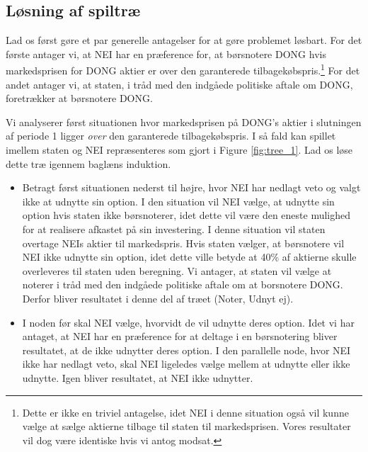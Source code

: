\documentclass{article}
\begin{document}
\begin{appendices}
\renewcommand\appendixname{Appendiks}

\section{Løsning af spiltræ}
\label{sec:app_tree}
Lad os først gøre et par generelle antagelser for at gøre problemet løsbart. For det første antager vi, at NEI har en præference for, at børsnotere DONG hvis markedsprisen for DONG aktier er over den garanterede tilbagekøbspris.\footnote{Dette er ikke en triviel antagelse, idet NEI i denne situation også vil kunne vælge at sælge aktierne tilbage til staten til markedsprisen. Vores resultater vil dog være identiske hvis vi antog modsat.} For det andet antager vi, at staten, i tråd med den indgåede politiske aftale om DONG, foretrækker at børsnotere DONG. %

Vi analyserer først situationen hvor markedsprisen på DONG's aktier i slutningen af periode 1 ligger \textit{over} den garanterede tilbagekøbspris. I så fald kan spillet imellem staten og NEI repræsenteres som gjort i Figure \ref{fig:tree_1}. Lad os løse dette træ igennem baglæns induktion.  

\begin{itemize}

	\item Betragt først situationen nederst til højre, hvor NEI har nedlagt veto og valgt ikke at udnytte sin option. I den situation vil NEI vælge, at udnytte sin option hvis staten ikke børsnoterer, idet dette vil være den eneste mulighed for at realisere afkastet på sin investering. I denne situation vil staten overtage NEIs aktier til markedspris. Hvis staten vælger, at børsnotere vil NEI ikke udnytte sin option, idet dette ville betyde at 40\% af aktierne skulle overleveres til staten uden beregning. Vi antager, at staten vil vælge at noterer i tråd med den indgåede politiske aftale om at borsnotere DONG. Derfor bliver resultatet i denne del af træet (Noter, Udnyt ej).

	\item I noden før skal NEI vælge, hvorvidt de vil udnytte deres option. Idet vi har antaget, at NEI har en præference for at deltage i en børsnotering bliver resultatet, at de ikke udnytter deres option. I den parallelle node, hvor NEI ikke har nedlagt veto, skal NEI ligeledes vælge mellem at udnytte eller ikke udnytte. Igen bliver resultatet, at NEI ikke udnytter.
	

\end{itemize}
\end{appendices}
\end{document}

